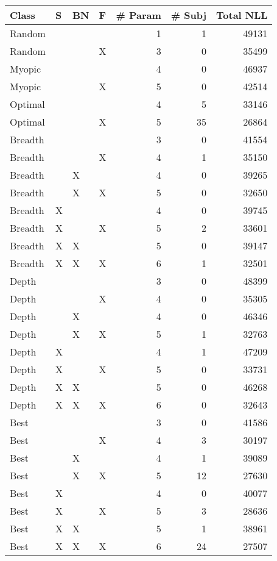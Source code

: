 \begin{tabular}{llllrrr}
\toprule
   Class &  S & BN &  F &  \# Param &  \# Subj &  Total NLL \\
\midrule
  Random &    &    &    &        1 &       1 &      49131 \\
  Random &    &    &  X &        3 &       0 &      35499 \\
  Myopic &    &    &    &        4 &       0 &      46937 \\
  Myopic &    &    &  X &        5 &       0 &      42514 \\
 Optimal &    &    &    &        4 &       5 &      33146 \\
 Optimal &    &    &  X &        5 &      35 &      26864 \\
 Breadth &    &    &    &        3 &       0 &      41554 \\
 Breadth &    &    &  X &        4 &       1 &      35150 \\
 Breadth &    &  X &    &        4 &       0 &      39265 \\
 Breadth &    &  X &  X &        5 &       0 &      32650 \\
 Breadth &  X &    &    &        4 &       0 &      39745 \\
 Breadth &  X &    &  X &        5 &       2 &      33601 \\
 Breadth &  X &  X &    &        5 &       0 &      39147 \\
 Breadth &  X &  X &  X &        6 &       1 &      32501 \\
   Depth &    &    &    &        3 &       0 &      48399 \\
   Depth &    &    &  X &        4 &       0 &      35305 \\
   Depth &    &  X &    &        4 &       0 &      46346 \\
   Depth &    &  X &  X &        5 &       1 &      32763 \\
   Depth &  X &    &    &        4 &       1 &      47209 \\
   Depth &  X &    &  X &        5 &       0 &      33731 \\
   Depth &  X &  X &    &        5 &       0 &      46268 \\
   Depth &  X &  X &  X &        6 &       0 &      32643 \\
    Best &    &    &    &        3 &       0 &      41586 \\
    Best &    &    &  X &        4 &       3 &      30197 \\
    Best &    &  X &    &        4 &       1 &      39089 \\
    Best &    &  X &  X &        5 &      12 &      27630 \\
    Best &  X &    &    &        4 &       0 &      40077 \\
    Best &  X &    &  X &        5 &       3 &      28636 \\
    Best &  X &  X &    &        5 &       1 &      38961 \\
    Best &  X &  X &  X &        6 &      24 &      27507 \\
\bottomrule
\end{tabular}
\unskip